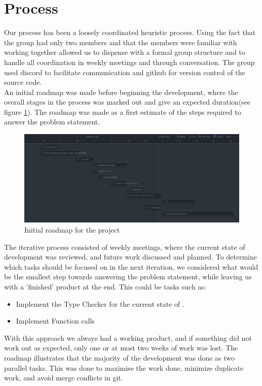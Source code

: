 \section{Process}
Our process has been a loosely coordinated heuristic process. Using the fact that the group had only two members and that the members were familiar with working together allowed us to dispense with a formal group structure and to handle all coordination in weekly meetings and through conversation. The group used discord to facilitate communication and github for version control of the source code.\\

An initial roadmap was made before beginning the development, where the overall stages in the process was marked out and give an expected duration(see figure \ref{fig:iterate}). The roadmap was made as a first estimate of the steps required to answer the problem statement. 

\begin{figure}[h]
\centering
\includegraphics[width=\textwidth]{02-Body/Images/Roadmap.png}
\caption{Initial roadmap for the project}
\label{fig:iterate}
\end{figure}

The iterative process consisted of weekly meetings, where the current state of
development was reviewed, and future work discussed and planned. To determine which tasks should be focused on in the next iteration, we considered what would be the smallest step towards answering the problem statement, while leaving us with a 'finished' product at the end. This could be tasks such as:
\begin{itemize}
  \item Implement the Type Checker for the current state of \lang{}.
  \item Implement Function calls
\end{itemize} 

With this approach we always had a working product, and if something did not work out
as expected, only one or at most two weeks of work was lost. The roadmap illustrates
that the majority of the development was done as two parallel tasks. This was done to
maximise the work done, minimize duplicate work, and avoid merge conflicts in git.

\newpage
